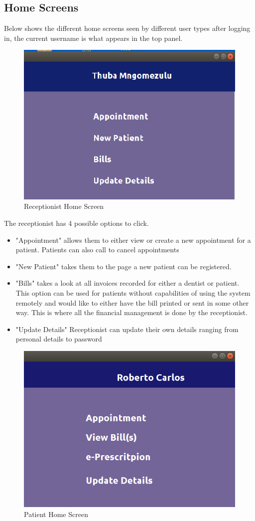 \documentclass[11 pt]{article}
\begin{document}
\subsection{Home Screens}
Below shows the different home screens seen by different user types after logging in, the current username is what appears in the top panel.
\begin{figure}[h]
\centering
\includegraphics[width=.7\linewidth]{receptionist_home.png}
\caption{Receptionist Home Screen}
\label{fig:ERD}
\end{figure}
The receptionist has 4 possible options to click.
\begin{itemize}
\item
"Appointment" allows them to either view or create a new appointment for a patient. Patients can also call to cancel appointments
\item
"New Patient" takes them to the page a new patient can be registered.
\item
"Bills" takes a look at all invoices recorded for either a dentist or patient. This option can be used for patients without capabilities of using the system remotely and would like to either have the bill printed or sent in some other way. This is where all the financial management is done by the receptionist.
\item
"Update Details" Receptionist can update their own details ranging from personal details to password
\end{itemize}
\begin{figure}[h]
\centering
\includegraphics[width=.7\linewidth]{patient_home.png}
\caption{Patient Home Screen}
\label{fig:ERD}
\end{figure}
\end{document}
